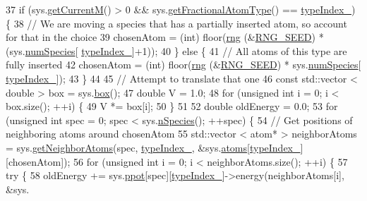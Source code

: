 \begin{DoxyCode}
37     \textcolor{keywordflow}{if} (sys.\hyperlink{classsim_system_a299fe4372e610b554eaaf5f5957b2dbc}{getCurrentM}() > 0 && sys.\hyperlink{classsim_system_a0500a9e84eecfbde7a98cf8a34f719d5}{getFractionalAtomType}() == 
      \hyperlink{classmc_move_acb731965547b0326ef318ec96da8b46a}{typeIndex\_}) \{
38         \textcolor{comment}{// We are moving a species that has a partially inserted atom, so account for that in the choice}
39         chosenAtom = (int) floor(\hyperlink{utilities_8cpp_a0f9542af4b475ac79cb679d7a8d14db0}{rng} (&\hyperlink{global_8h_a3f4e4ea24d5a5c66feae55d1f329c884}{RNG\_SEED}) * (sys.\hyperlink{classsim_system_a9eea865e6dc1cff377b1e79c4d9c23f0}{numSpecies}[
      \hyperlink{classmc_move_acb731965547b0326ef318ec96da8b46a}{typeIndex\_}]+1));
40     \} \textcolor{keywordflow}{else} \{
41         \textcolor{comment}{// All atoms of this type are fully inserted}
42         chosenAtom = (int) floor(\hyperlink{utilities_8cpp_a0f9542af4b475ac79cb679d7a8d14db0}{rng} (&\hyperlink{global_8h_a3f4e4ea24d5a5c66feae55d1f329c884}{RNG\_SEED}) * sys.\hyperlink{classsim_system_a9eea865e6dc1cff377b1e79c4d9c23f0}{numSpecies}[
      \hyperlink{classmc_move_acb731965547b0326ef318ec96da8b46a}{typeIndex\_}]);
43     \}
44 
45     \textcolor{comment}{// Attempt to translate that one}
46     \textcolor{keyword}{const} std::vector < double > box = sys.\hyperlink{classsim_system_a8bff9dfb95b1b09a0fab2c1c485ade07}{box}();
47     \textcolor{keywordtype}{double} V = 1.0;
48     \textcolor{keywordflow}{for} (\textcolor{keywordtype}{unsigned} \textcolor{keywordtype}{int} i = 0; i < box.size(); ++i) \{
49         V *= box[i];
50     \}
51 
52     \textcolor{keywordtype}{double} oldEnergy = 0.0;
53     \textcolor{keywordflow}{for} (\textcolor{keywordtype}{unsigned} \textcolor{keywordtype}{int} spec = 0; spec < sys.\hyperlink{classsim_system_ab5e2e9b6204de15520302fe1d51688dd}{nSpecies}(); ++spec) \{
54         \textcolor{comment}{// Get positions of neighboring atoms around chosenAtom}
55         std::vector < atom* > neighborAtoms = sys.\hyperlink{classsim_system_a9b3aeefa22c3b50b5913df6eea753bc6}{getNeighborAtoms}(spec, 
      \hyperlink{classmc_move_acb731965547b0326ef318ec96da8b46a}{typeIndex\_}, &sys.\hyperlink{classsim_system_a90421b19082f7fb8fc23b7264b1161e4}{atoms}[\hyperlink{classmc_move_acb731965547b0326ef318ec96da8b46a}{typeIndex\_}][chosenAtom]);
56         \textcolor{keywordflow}{for} (\textcolor{keywordtype}{unsigned} \textcolor{keywordtype}{int} i = 0; i < neighborAtoms.size(); ++i) \{
57             \textcolor{keywordflow}{try} \{
58                 oldEnergy += sys.\hyperlink{classsim_system_ad2e290b5963f132e6a3a56cee35c8e9f}{ppot}[spec][\hyperlink{classmc_move_acb731965547b0326ef318ec96da8b46a}{typeIndex\_}]->energy(neighborAtoms[i], &sys.

\end{DoxyCode}
